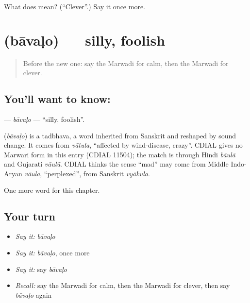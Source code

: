 \begin{tcolorbox}[breakable,colback=teal!4,colframe=teal!35!black,title={Before you move on}]
What does  mean? (\textquotedblleft{}Clever\textquotedblright{}.) Say it once more.
\end{tcolorbox}
\section[\texorpdfstring{\mw{बावळो} (bāvaḷo)}{बावळो (bāvaḷo)}]{ (bāvaḷo) — silly, foolish}

\label{lesson:MW-C146-bavalo}



\begin{quote}
Before the new one: say the Marwadi for calm, then the Marwadi for clever.
\end{quote}

\subsection*{You'll want to know: }
\textbf{} — \emph{bāvaḷo} — \textquotedblleft{}silly, foolish\textquotedblright{}.

\begin{cousinweb}
\textbf{} (\emph{bāvaḷo}) is a tadbhava, a word inherited from Sanskrit and reshaped by sound change. It comes from \emph{vātula}, \textquotedblleft{}affected by wind-disease, crazy\textquotedblright{}. CDIAL gives no Marwari form in this entry (CDIAL 11504); the match is through Hindi \emph{bāulā} and Gujarati \emph{vāulũ}. CDIAL thinks the sense \textquotedblleft{}mad\textquotedblright{} may come from Middle Indo-Aryan \emph{vāula}, \textquotedblleft{}perplexed\textquotedblright{}, from Sanskrit \emph{vyākula}.
\end{cousinweb}

\begin{grammarlens}[title={What you've built}]
One more word for this chapter.
\end{grammarlens}

\subsection*{Your turn}
\begin{itemize}
\raggedright
  \item \emph{Say it:} \emph{bāvaḷo}
  \item \emph{Say it:} \emph{bāvaḷo}, once more
  \item \emph{Say it:} say \emph{bāvaḷo}
  \item \emph{Recall:} say the Marwadi for calm, then the Marwadi for clever, then say \emph{bāvaḷo} again
\end{itemize}

